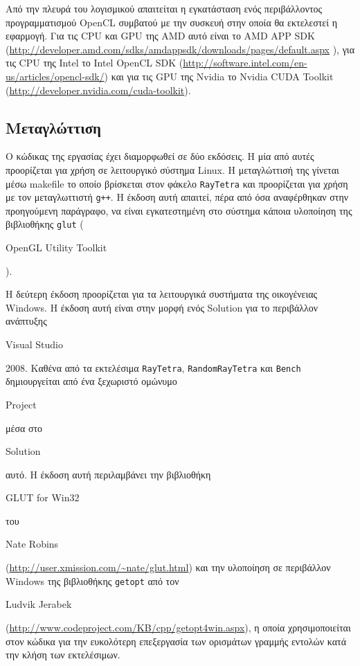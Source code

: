 Από την πλευρά του λογισμικού απαιτείται η εγκατάσταση ενός περιβάλλοντος προγραμματισμού ΟpenCL συμβατού με την  συσκευή στην οποία θα εκτελεστεί η εφαρμογή. Για τις CPU και GPU της AMD αυτό είναι το AMD APP SDK (\url{http://developer.amd.com/sdks/amdappsdk/downloads/pages/default.aspx} ), για τις CPU της Intel το Intel OpenCL SDK  (\url{http://software.intel.com/en-us/articles/opencl-sdk/}) και για τις GPU της Nvidia το Nvidia CUDA Toolkit  (\url{http://developer.nvidia.com/cuda-toolkit}). 
 
\subsection{Μεταγλώττιση}
\noindent Ο κώδικας της εργασίας έχει διαμορφωθεί σε δύο εκδόσεις. Η μία από αυτές προορίζεται για χρήση σε λειτουργικό σύστημα Linux. Η μεταγλώττισή της γίνεται μέσω makefile το οποίο βρίσκεται στον φάκελο \verb!RayTetra! και προορίζεται για χρήση με τον μεταγλωττιστή \verb!g++!. Η έκδοση αυτή απαιτεί, πέρα από όσα αναφέρθηκαν στην προηγούμενη παράγραφο, να είναι εγκατεστημένη στο σύστημα κάποια υλοποίηση της βιβλιοθήκης \verb!glut! (\begin{english}OpenGL Utility Toolkit\end{english}). 

Η δεύτερη έκδοση προορίζεται για τα λειτουργικά συστήματα της οικογένειας Windows. Η έκδοση αυτή είναι στην μορφή ενός Solution για το περιβάλλον ανάπτυξης \begin{english}Visual Studio\end{english} 2008. Καθένα από τα εκτελέσιμα \verb!RayTetra!, \verb!RandomRayTetra! και \verb!Bench! δημιουργείται από ένα ξεχωριστό ομώνυμο \begin{english}Project\end{english} μέσα στο \begin{english}Solution\end{english} αυτό. Η έκδοση αυτή περιλαμβάνει την βιβλιοθήκη \begin{english}GLUT for Win32\end{english} του \begin{english}Nate Robins\end{english} (\url{http://user.xmission.com/~nate/glut.html}) και την υλοποίηση σε περιβάλλον Windows της βιβλιοθήκης \verb!getopt! από τον \begin{english}Ludvik Jerabek\end{english} (\url{http://www.codeproject.com/KB/cpp/getopt4win.aspx}), η οποία χρησιμοποιείται στον κώδικα για την ευκολότερη επεξεργασία των ορισμάτων γραμμής εντολών κατά την κλήση των εκτελέσιμων.

